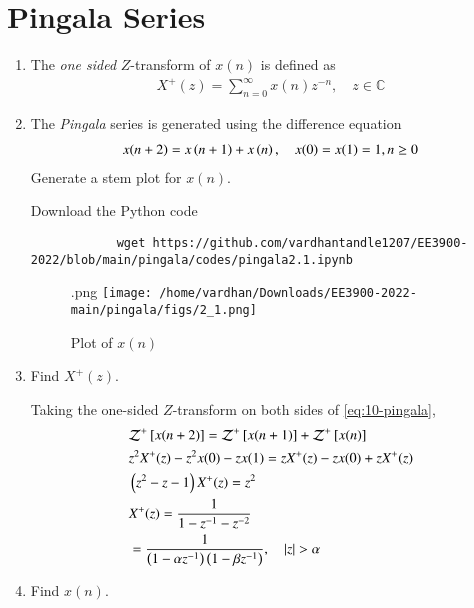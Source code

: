 \documentclass[journal,12pt,twocolumn]{IEEEtran}
\renewcommand\thesection{\arabic{section}}
\begin{document}
	\section{Pingala Series}
	\begin{enumerate}[label=\thesection.\arabic*,ref=\thesection.\theenumi]
		\item The {\em one sided} $Z$-transform of $x(n)$ is defined as 
		\begin{align}
			X^{+}(z) = \sum_{n = 0}^{\infty}x(n)z^{-n}, \quad z \in \mathbb{C}
			\label{eq:one-Z}
		\end{align}
		\item The {\em Pingala} series is generated using the difference equation 
		\begin{align}
			x(n+2) = x\left(n+1\right) + x\left(n\right),  \quad x(0) = x(1) = 1, n \ge 0
			\label{eq:10-pingala}
		\end{align}
		Generate a stem plot for $x(n)$.
		
		\solution
		Download the Python code
		\begin{lstlisting}
			wget https://github.com/vardhantandle1207/EE3900-2022/blob/main/pingala/codes/pingala2.1.ipynb
		\end{lstlisting}
		\begin{figure}[!htp].png
			\texttt{[image: /home/vardhan/Downloads/EE3900-2022-main/pingala/figs/2\_1.png]}
			\caption{Plot of $x(n)$}
			\label{fig:xn}
		\end{figure}
		
		\newpage
		\item Find $X^{+}(z)$.
		
		\solution Taking the one-sided $Z$-transform on both sides of \eqref{eq:10-pingala},
		\begin{align}
			&\mathcal{Z}^+{}\left[x(n + 2)\right] = \mathcal{Z}^+{}\left[x(n + 1)\right] + \mathcal{Z}^+{}\left[x(n)\right] \\
			&z^2X^+(z) - z^2x(0) - zx(1) = zX^+(z) - zx(0) + zX^+(z) \\
			&\left(z^2 - z - 1\right)X^+(z) = z^2 \\
			&X^+(z) = \frac{1}{1 - z^{-1} - z^{-2}} \\
			&= \frac{1}{\left(1 - \alpha z^{-1}\right)\left(1 - \beta z^{-1}\right)}, \quad |z| > \alpha
			\label{eq:X-z}
		\end{align}
		\item Find $x(n)$.
		

\end{enumerate}
\end{document}
